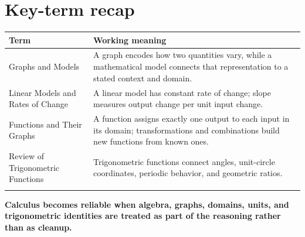 \documentclass[11pt]{article}
\begin{document}
\normalsize

\section{Key-term recap}
\small
\begin{longtable}{@{}>{\RaggedRight\arraybackslash}p{}>{\RaggedRight\arraybackslash}p{}@{}}
\toprule
\textbf{Term} & \textbf{Working meaning}\\
\midrule\endhead
Graphs and Models & A graph encodes how two quantities vary, while a mathematical model connects that representation to a stated context and domain. \\\addlinespace[2pt]
Linear Models and Rates of Change & A linear model has constant rate of change; slope measures output change per unit input change. \\\addlinespace[2pt]
Functions and Their Graphs & A function assigns exactly one output to each input in its domain; transformations and combinations build new functions from known ones. \\\addlinespace[2pt]
Review of Trigonometric Functions & Trigonometric functions connect angles, unit-circle coordinates, periodic behavior, and geometric ratios. \\\addlinespace[2pt]
\bottomrule
\end{longtable}
\normalsize

\enlargethispage{4\baselineskip}
\begin{tcolorbox}[title=One-sentence takeaway,fonttitle=\bfseries,colback=Ink,colframe=Ink,coltext=white,coltitle=white,arc=2mm,boxrule=0pt]
\centering\bfseries Calculus becomes reliable when algebra, graphs, domains, units, and trigonometric identities are treated as part of the reasoning rather than as cleanup.
\end{tcolorbox}
\end{document}
